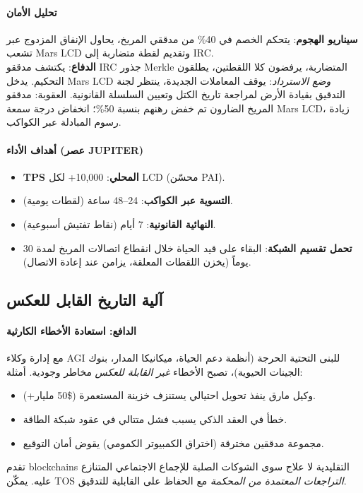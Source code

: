 \documentclass[11pt]{article}
\begin{document}
\paragraph{تحليل الأمان}
\textbf{سيناريو الهجوم}: يتحكم الخصم في 40\% من مدققي المريخ، يحاول الإنفاق المزدوج عبر تشعب Mars LCD وتقديم لقطة متضاربة إلى IRC.\\
\textbf{الدفاع}: يكتشف مدققو IRC جذور Merkle المتضاربة، يرفضون كلا اللقطتين، يطلقون التحكيم. يدخل Mars LCD \emph{وضع الاسترداد}: يوقف المعاملات الجديدة، ينتظر لجنة التدقيق بقيادة الأرض لمراجعة تاريخ الكتل وتعيين السلسلة القانونية. العقوبة: مدققو المريخ الضارون تم خفض رهنهم بنسبة 50\%؛ انخفاض درجة سمعة Mars LCD، زيادة رسوم المبادلة عبر الكواكب.

\paragraph{أهداف الأداء (عصر JUPITER)}
\begin{itemize}[noitemsep]
  \item \textbf{TPS المحلي}: 10,000+ لكل LCD (محسّن PAI).
  \item \textbf{التسوية عبر الكواكب}: 24--48 ساعة (لقطات يومية).
  \item \textbf{النهائية القانونية}: 7 أيام (نقاط تفتيش أسبوعية).
  \item \textbf{تحمل تقسيم الشبكة}: البقاء على قيد الحياة خلال انقطاع اتصالات المريخ لمدة 30 يوماً (يخزن اللقطات المعلقة، يزامن عند إعادة الاتصال).
\end{itemize}

\subsection{آلية التاريخ القابل للعكس}

\paragraph{الدافع: استعادة الأخطاء الكارثية}
مع إدارة وكلاء AGI للبنى التحتية الحرجة (أنظمة دعم الحياة، ميكانيكا المدار، بنوك الجينات الحيوية)، تصبح الأخطاء \emph{غير القابلة للعكس} مخاطر وجودية. أمثلة:
\begin{itemize}[noitemsep]
  \item وكيل مارق ينفذ تحويل احتيالي يستنزف خزينة المستعمرة (\$50 مليار+).
  \item خطأ في العقد الذكي يسبب فشل متتالي في عقود شبكة الطاقة.
  \item مجموعة مدققين مخترقة (اختراق الكمبيوتر الكمومي) يقوض أمان التوقيع.
\end{itemize}
تقدم blockchains التقليدية لا علاج سوى الشوكات الصلبة للإجماع الاجتماعي المتنازع عليه. يمكّن TOS \emph{التراجعات المعتمدة من المحكمة} مع الحفاظ على القابلية للتدقيق.
\end{document}

